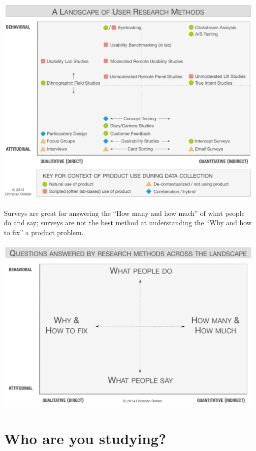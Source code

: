 \documentclass[]{book}
\begin{document}
\begin{center}\includegraphics{figs/nng_ux_methods_chart2} \end{center}

Surveys are great for answering the ``How many and how much'' of what people do and say; surveys are not the best method at understanding the ``Why and how to fix'' a product problem.

\includegraphics{figs/nng_ux_methods_chart.png}

\hypertarget{who-are-you-studying}{%
\section{Who are you studying?}\label{who-are-you-studying}}
\end{document}
